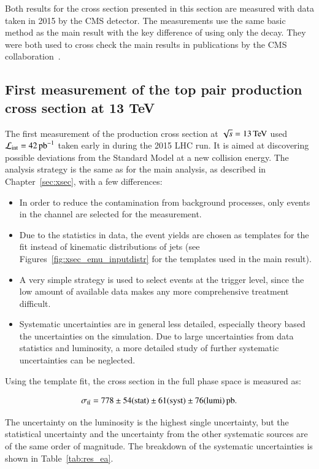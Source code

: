 Both results for the \ttbar cross section presented in this section are measured with data taken in 2015 by the CMS detector.
The measurements use the same basic method as the main result with the key difference of using only the \emu decay.
They were both used to cross check the main results in publications by the CMS collaboration~\cite{Khachatryan:2015uqb,Khachatryan:2016kzg}.

\subsection{First measurement of the top pair production cross section at 13 TeV}
\label{sec:res_ea}

The first measurement of the \ttbar production cross section at $\sqrt{s}= 13 \,\text{Te\hspace{-.08em}V}$ used $\mathcal{L}_\mathrm{int}= 42 \mbox{\ensuremath{\,\text{pb}^\text{$-$1}}}$ taken early in during the 2015 LHC run.
It is aimed at discovering possible deviations from the Standard Model at a new collision energy.
The analysis strategy is the same as for the main analysis, as described in Chapter~\ref{sec:xsec}, with a few differences: 

\begin{itemize}
\item In order to reduce the contamination from background processes, only events in the \emu channel are selected for the measurement.
\item Due to the statistics in data, the event yields are chosen as templates for the fit instead of kinematic distributions of jets (see Figures~\ref{fig:xsec_emu_inputdistr} for the templates used in the main result).
\item A very simple strategy is used to select events at the trigger level, since the low amount of available data makes any more comprehensive treatment difficult.
\item Systematic uncertainties are in general less detailed, especially theory based the uncertainties on the simulation. Due to large uncertainties
from data statistics and luminosity, a more detailed study of further systematic uncertainties can be neglected.
\end{itemize}

Using the template fit, the \ttbar cross section in the full phase space is measured as:

\begin{equation}
\sigma_{\mathrm{t}\bar{\mathrm{t}}} = 778 \pm  54 ({\rm stat}) \pm 61 ({\rm syst}) \pm 76 ({\rm lumi}) \mbox{\ensuremath{\,\text{pb}}}.
\end{equation}

The uncertainty on the luminosity is the highest single uncertainty, but the statistical uncertainty and the uncertainty from the other systematic sources are of the same order of magnitude.
The breakdown of the systematic uncertainties is shown in Table~\ref{tab:res_ea}.

